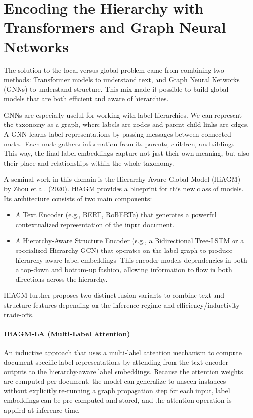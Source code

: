 \section{Encoding the Hierarchy with Transformers and Graph Neural Networks}

The solution to the local-versus-global problem came from combining two methods: Transformer models to understand text, and Graph Neural Networks (GNNs) to understand structure. This mix made it possible to build global models that are both efficient and aware of hierarchies. \cite{wang2024graphneuralnetworkstext, zhou-etal-2020-hierarchy}

GNNs are especially useful for working with label hierarchies. \cite{li2021heterogeneous} We can represent the taxonomy as a graph, where labels are nodes and parent-child links are edges. A GNN learns label representations by passing messages between connected nodes. Each node gathers information from its parents, children, and siblings. This way, the final label embeddings capture not just their own meaning, but also their place and relationships within the whole taxonomy.

A seminal work in this domain is the Hierarchy-Aware Global Model (HiAGM) by Zhou et al. (2020). HiAGM provides a blueprint for this new class of models. Its architecture consists of two main components:~\cite{zhou-etal-2020-hierarchy}

\begin{itemize}
	\item A Text Encoder (e.g., BERT, RoBERTa) that generates a powerful contextualized representation of the input document.
	\item A Hierarchy-Aware Structure Encoder (e.g., a Bidirectional Tree-LSTM or a specialized Hierarchy-GCN) that operates on the label graph to produce hierarchy-aware label embeddings. This encoder models dependencies in both a top-down and bottom-up fashion, allowing information to flow in both directions across the hierarchy.
\end{itemize}

HiAGM further proposes two distinct fusion variants to combine text and structure features depending on the inference regime and efficiency/inductivity trade-offs.

\paragraph{HiAGM-LA (Multi-Label Attention)}
An inductive approach that uses a multi-label attention mechanism to compute document-specific label representations by attending from the text encoder outputs to the hierarchy-aware label embeddings. Because the attention weights are computed per document, the model can generalize to unseen instances without explicitly re-running a graph propagation step for each input, label embeddings can be pre-computed and stored, and the attention operation is applied at inference time.

